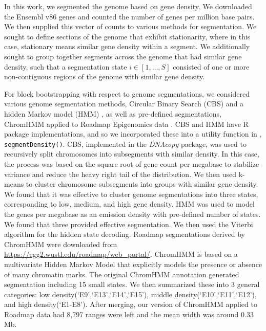 \documentclass{article}
\begin{document}
In this work, we segmented the genome based on gene density. We
downloaded the Ensembl v86 genes \citep{ensemblTrimmedEntry} 
and counted the 
number of genes per million base pairs. We then supplied this vector
of counts to various methods for segmentation. We sought to define
sections of the genome that exhibit stationarity, where in this case,
stationary means similar gene density within a segment. We
additionally sought to group together segments across the genome that
had similar gene density, such that a segmentation state
$i \in [1,\dots,S]$ consisted of one or more non-contiguous regions of
the genome with similar gene density.

For block bootstrapping with respect to genome segmentations,
we considered various genome segmentation methods,
Circular Binary Search (CBS) \citep{cbs} and a hidden Markov model (HMM)
\citep{rcpphmm}, as well as pre-defined segmentations,
ChromHMM applied to 
Roadmap Epigenomics data \citep{ernst2012chromhmm}.
CBS and HMM
have R package implementations, and so we incorporated these
into a utility function in \nullranges, \texttt{segmentDensity()}.
CBS, implemented in the \textit{DNAcopy} package, was used to recursively split
chromosomes into subsegments with similar density. In this case, the
process was based on the square root of gene count per megabase to
stabilize variance and reduce the heavy right tail of the
distribution. We then used k-means to cluster
chromosome subsegments into groups with similar gene
density. We found that it was effective to cluster genome segmentations into
three states, corresponding to low, medium, and high gene
density. 
HMM was used to model the genes per megabase as an emission
density with pre-defined number of states. We found that three provided effective segmentation. 
We then used the Viterbi algorithm for the hidden state decoding. 
Roadmap segmentations derived by ChromHMM \citep{ernst2012chromhmm} were
downloaded from
\url{https://egg2.wustl.edu/roadmap/web_portal/}. ChromHMM is based on
a multivariate Hidden Markov Model that explicitly models the presence
or absence of many chromatin marks. The original ChromHMM annotation
generated segmentation including 
15 small states. We then summarized these into 3 general categories: low
density(`E9',`E13',`E14',`E15'), middle density(`E10',`E11',`E12'),
and high density(`E1-E8'). 
After merging, our version of ChromHMM applied to Roadmap data had
8,797 ranges were left and the mean width was around 
0.33 Mb.
\end{document}
